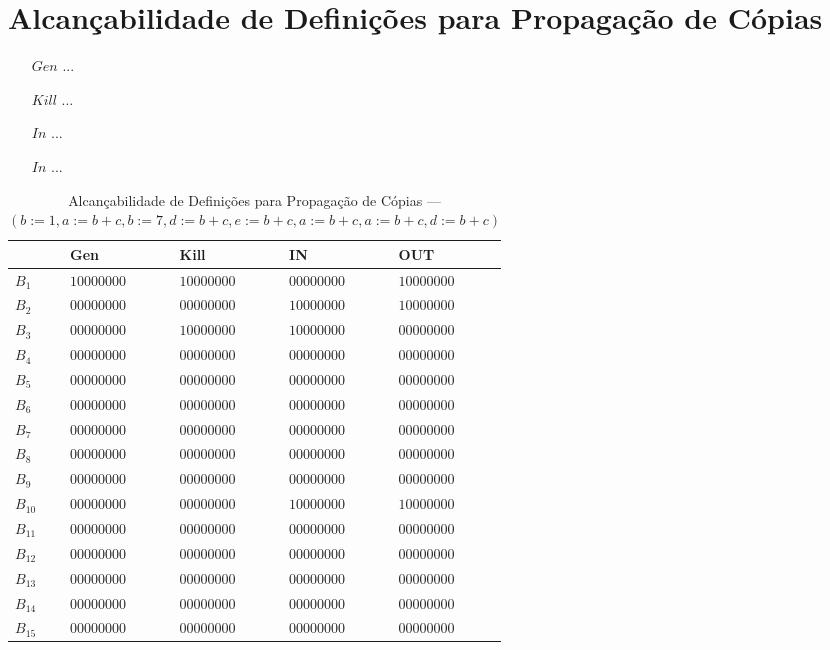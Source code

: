 \section{Alcan\c{c}abilidade de Defini\c{c}\~oes para Propaga\c{c}\~ao de C\'opias}

\begin{itemize}
  \item[$Gen$] ...
  \item[$Kill$] ...
  \item[$In$] ...
  \item[$In$] ...
\end{itemize}

\begin{table}[ht]
\centering
\begin{tabular}{l|l|l|l|l}
	& Gen & Kill & IN & OUT\\
\hline
$B_{1}$ &  $10000000$ & $10000000$ & $00000000$ & $10000000$\\
$B_{2}$ &  $00000000$ & $00000000$ & $10000000$ & $10000000$\\
$B_{3}$ &  $00000000$ & $10000000$ & $10000000$ & $00000000$\\
$B_{4}$ &  $00000000$ & $00000000$ & $00000000$ & $00000000$\\
$B_{5}$ &  $00000000$ & $00000000$ & $00000000$ & $00000000$\\
$B_{6}$ &  $00000000$ & $00000000$ & $00000000$ & $00000000$\\
$B_{7}$ &  $00000000$ & $00000000$ & $00000000$ & $00000000$\\
$B_{8}$ &  $00000000$ & $00000000$ & $00000000$ & $00000000$\\
$B_{9}$ &  $00000000$ & $00000000$ & $00000000$ & $00000000$\\
$B_{10}$ &  $00000000$ & $00000000$ & $10000000$ & $10000000$\\
$B_{11}$ &  $00000000$ & $00000000$ & $00000000$ & $00000000$\\
$B_{12}$ &  $00000000$ & $00000000$ & $00000000$ & $00000000$\\
$B_{13}$ &  $00000000$ & $00000000$ & $00000000$ & $00000000$\\
$B_{14}$ &  $00000000$ & $00000000$ & $00000000$ & $00000000$\\
$B_{15}$ &  $00000000$ & $00000000$ & $00000000$ & $00000000$\\
\end{tabular}
\caption{Alcan\c{c}abilidade de Defini\c{c}\~oes para Propaga\c{c}\~ao de C\'opias --- $(b:=1, a:=b+c, b:=7, d:=b+c, e:=b+c, a:=b+c, a:=b+c, d:=b+c)$}
\end{table}

